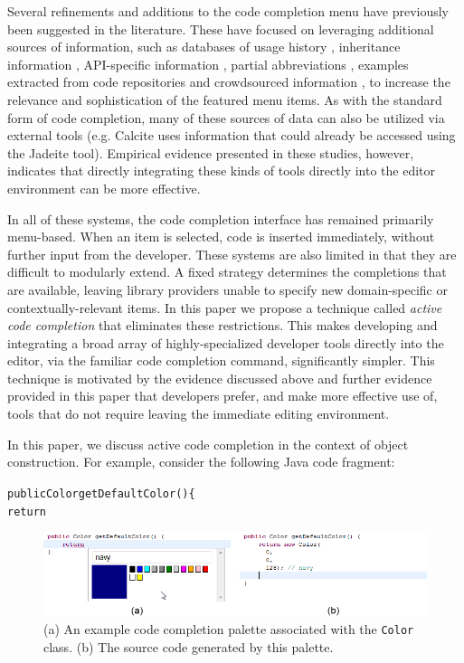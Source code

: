 \documentclass[10pt, conference, compsocconf]{IEEEtran}
\begin{document}
Several refinements and additions to the code completion menu have previously been suggested in the literature. These have focused on leveraging additional sources of information, such as databases of usage history \cite{robbes_how_2008}\cite{HouPletcher2011}, inheritance information \cite{HouPletcher2011}, API-specific information \cite{HouPletcher2011}\cite{Lee+2008}, partial abbreviations \cite{Han+2009}, examples extracted from code repositories \cite{bruch_learning_2009} and crowdsourced information \cite{mooty_calcite:_2010}, to increase the relevance and sophistication of the featured menu items. As with the standard form of code completion, many of these sources of data can also be utilized via external tools (e.g. Calcite \cite{mooty_calcite:_2010} uses information that could already be accessed using the Jadeite \cite{conf/vl/StylosFYM09} tool). Empirical evidence presented in these studies, however, indicates that directly integrating these kinds of tools directly into the editor environment can be more effective.

In all of these systems, the code completion interface has remained primarily menu-based. When an item is selected, code is inserted immediately, without further input from the developer. These systems are also limited in that they are difficult to modularly extend. A fixed strategy determines the completions that are available, leaving library providers unable to specify new domain-specific or contextually-relevant items. 
In this paper we propose a technique called {\it active code completion} that eliminates these restrictions. This  makes developing and integrating a broad array of highly-specialized developer tools directly into the editor, via the familiar code completion command, significantly simpler. This technique is motivated by the evidence discussed above and further evidence provided in this paper that developers prefer, and make more effective use of, tools that do not require leaving the immediate editing environment.

In this paper, we discuss active code completion in the context of object construction. For example, consider the following Java code fragment:

\begin{alltt}
  public Color getDefaultColor() \{
      return \textvisiblespace
\end{alltt}

\begin{figure}\label{color}
\begin{center}
\includegraphics[width=\textwidth]{color_palette.png}\end{center}
\caption{(a) An example code completion palette associated with the \texttt{Color} class. (b) The source code generated by this palette.}
\end{figure}
\end{document}
